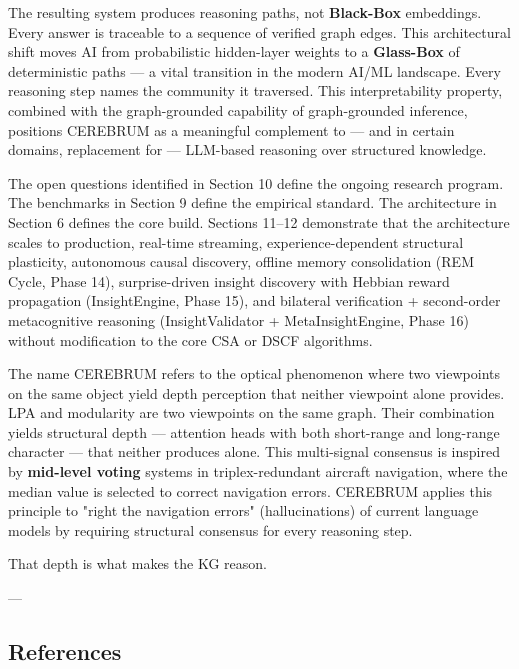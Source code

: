 \documentclass[10pt,journal,compsoc]{IEEEtran}
\begin{document}
The resulting system produces reasoning paths, not \textbf{Black-Box} embeddings. Every
answer is traceable to a sequence of verified graph edges. This archi\-tectural shift 
moves AI from proba\-bilistic hidden-layer weights to a \textbf{Glass-Box} of deter\-ministic 
paths — a vital transition in the modern AI/ML landscape. Every reasoning step
names the community it traversed. This inter\-pretability property, combined with
the graph-grounded capability of graph-grounded inference, positions CEREBRUM
as a meaningful complement to — and in certain domains, replacement for —
LLM-based reasoning over structured knowledge.

The open questions identified in Section 10 define the ongoing research program.
The benchmarks in Section 9 define the empirical standard. The archi\-tecture in
Section 6 defines the core build. Sections 11–12 demonstrate that the
archi\-tecture scales to production, real-time streaming, experience-dependent
structural plasticity, autonomous causal discovery, offline memory conso\-lidation
(REM Cycle, Phase 14), surprise-driven insight discovery with Hebbian reward
propagation (InsightEngine, Phase 15), and bilateral verif\-ication + second-order
metac\-ognitive reasoning (InsightValidator + MetaInsightEngine, Phase 16) without
modif\-ication to the core CSA or DSCF algorithms.

The name CEREBRUM refers to the optical phenomenon where two viewpoints on
the same object yield depth perception that neither viewpoint alone provides.
LPA and modularity are two viewpoints on the same graph. Their combination
yields structural depth — attention heads with both short-range and long-range
character — that neither produces alone. This multi-signal consensus is inspired 
by \textbf{mid-level voting} systems in triplex-redundant aircraft navigation, where 
the median value is selected to correct navigation errors. CEREBRUM applies this 
principle to "right the navigation errors" (hallu\-cinations) of current language 
models by requiring structural consensus for every reasoning step.

That depth is what makes the KG reason.

---

\subsection{References}
\end{document}
